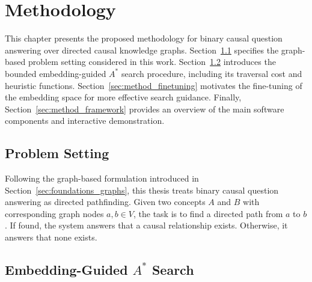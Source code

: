 \chapter{Methodology}
\label{chap:methodology}

This chapter presents the proposed methodology for binary causal question answering over directed causal knowledge graphs. Section~\ref{sec:method_formulation} specifies the graph-based problem setting considered in this work. Section~\ref{sec:method_search} introduces the bounded embedding-guided $A^*$ search procedure, including its traversal cost and heuristic functions. Section~\ref{sec:method_finetuning} motivates the fine-tuning of the embedding space for more effective search guidance. Finally, Section~\ref{sec:method_framework} provides an overview of the main software components and interactive demonstration.

\section{Problem Setting}
\label{sec:method_formulation}

Following the graph-based formulation introduced in Section~\ref{sec:foundations_graphs}, this thesis treats binary causal question answering as directed pathfinding. Given two concepts $A$ and $B$ with corresponding graph nodes $a,b\in V$, the task is to find a directed path from $a$ to $b$. If found, the system answers that a causal relationship exists. Otherwise, it answers that none exists.

\section{Embedding-Guided \texorpdfstring{$A^*$}{A*} Search}
\label{sec:method_search}

